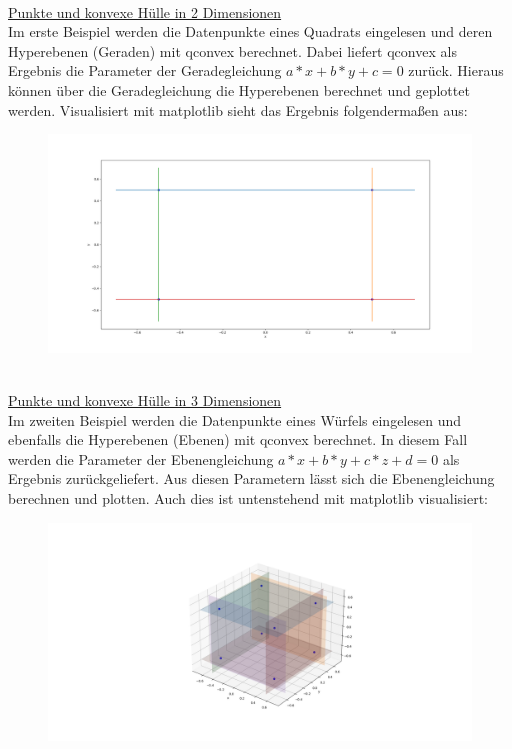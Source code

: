\documentclass[12pt]{scrartcl}
\begin{document}
\ \\
\underline{Punkte und konvexe Hülle in 2 Dimensionen}\ \\
Im erste Beispiel werden die Datenpunkte eines Quadrats eingelesen und deren Hyperebenen (Geraden) mit qconvex berechnet. Dabei liefert qconvex als Ergebnis die Parameter der Geradegleichung $a*x + b*y +c = 0$ zurück. Hieraus können über die Geradegleichung die Hyperebenen berechnet und geplottet werden. Visualisiert mit matplotlib sieht das Ergebnis folgendermaßen aus:
\begin{figure}[ht]
    \centering
    \includegraphics[scale=0.2]{squareplot.png}
\end{figure}
\ \\
\underline{Punkte und konvexe Hülle in 3 Dimensionen}\ \\
Im zweiten Beispiel werden die Datenpunkte eines Würfels eingelesen und ebenfalls die Hyperebenen (Ebenen) mit qconvex berechnet. In diesem Fall werden die Parameter der Ebenengleichung $a*x + b*y + c*z + d = 0$ als Ergebnis zurückgeliefert. Aus diesen Parametern lässt sich die Ebenengleichung berechnen und plotten. Auch dies ist untenstehend mit matplotlib visualisiert:
\begin{figure}[ht]
    \centering
    \includegraphics[scale=0.3]{cubeplot.png}
\end{figure}
\end{document}
